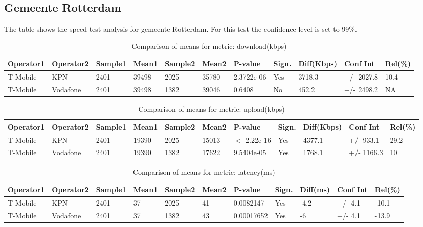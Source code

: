 \documentclass[]{article}
\begin{document}
\normalsize

\newpage

\subsection{Gemeente Rotterdam}\label{gemeente-rotterdam}

The table shows the speed test analysis for gemeente Rotterdam. For this
test the confidence level is set to 99\%.

\begin{table}[ht]
\centering
{\footnotesize
\begin{tabular}{lllllllllll}
  \hline
Operator1 & Operator2 & Sample1 & Mean1 & Sample2 & Mean2 & P-value & Sign. & Diff(Kbps) & Conf Int & Rel(\%) \\ 
  \hline
T-Mobile & KPN & 2401 & 39498 & 2025 & 35780 & 2.3722e-06 & Yes & 3718.3 & +/- 2027.8 & 10.4 \\ 
  T-Mobile & Vodafone & 2401 & 39498 & 1382 & 39046 & 0.6408 & No & 452.2 & +/- 2498.2 & NA \\ 
   \hline
\end{tabular}
}
\caption{Comparison of means for metric: download(kbps)} 
\end{table}\begin{table}[ht]
\centering
{\footnotesize
\begin{tabular}{lllllllllll}
  \hline
Operator1 & Operator2 & Sample1 & Mean1 & Sample2 & Mean2 & P-value & Sign. & Diff(Kbps) & Conf Int & Rel(\%) \\ 
  \hline
T-Mobile & KPN & 2401 & 19390 & 2025 & 15013 & $<$ 2.22e-16 & Yes & 4377.1 & +/- 933.1 & 29.2 \\ 
  T-Mobile & Vodafone & 2401 & 19390 & 1382 & 17622 & 9.5404e-05 & Yes & 1768.1 & +/- 1166.3 & 10 \\ 
   \hline
\end{tabular}
}
\caption{Comparison of means for metric: upload(kbps)} 
\end{table}\begin{table}[ht]
\centering
{\footnotesize
\begin{tabular}{lllllllllll}
  \hline
Operator1 & Operator2 & Sample1 & Mean1 & Sample2 & Mean2 & P-value & Sign. & Diff(ms) & Conf Int & Rel(\%) \\ 
  \hline
T-Mobile & KPN & 2401 & 37 & 2025 & 41 & 0.0082147 & Yes & -4.2 & +/- 4.1 & -10.1 \\ 
  T-Mobile & Vodafone & 2401 & 37 & 1382 & 43 & 0.00017652 & Yes & -6 & +/- 4.1 & -13.9 \\ 
   \hline
\end{tabular}
}
\caption{Comparison of means for metric: latency(ms)} 
\end{table}
\end{document}
